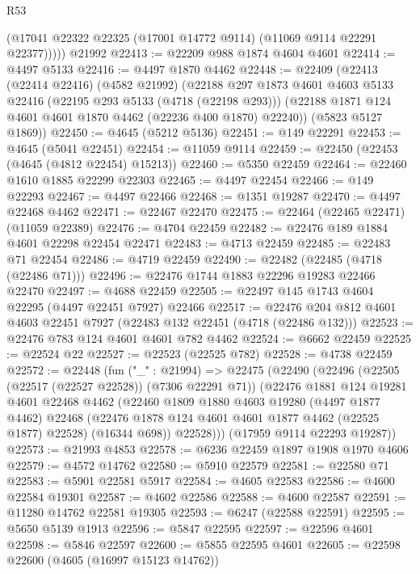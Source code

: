 \begin{lexlean}{R53}
\begin{coremodule}
          (@17041 @22322 @22325 (@17001 @14772 @9114) (@11069 @9114 @22291 @22377)))))
    @21992
@22413 := @22209 @988 @1874 @4604 @4601
@22414 := @4497 @5133
@22416 := @4497 @1870 @4462
@22448 := @22409
    (@22413
      (@22414 @22416)
      (@4582 @21992)
      (@22188
        @297
        @1873
        @4601
        @4603
        @5133
        @22416
        (@22195 @293 @5133 (@4718 (@22198 @293)))
        (@22188 @1871 @124 @4601 @4601 @1870 @4462 (@22236 @400 @1870) @22240))
      (@5823 @5127 @1869))
@22450 := @4645 (@5212 @5136)
@22451 := @149 @22291
@22453 := @4645 (@5041 @22451)
@22454 := @11059 @9114
@22459 := @22450 (@22453 (@4645 (@4812 @22454) @15213))
@22460 := @5350 @22459
@22464 := @22460 @1610 @1885 @22299 @22303
@22465 := @4497 @22454
@22466 := @149 @22293
@22467 := @4497 @22466
@22468 := @1351 @19287
@22470 := @4497 @22468 @4462
@22471 := @22467 @22470
@22475 := @22464 (@22465 @22471) (@11059 @22389)
@22476 := @4704 @22459
@22482 := @22476 @189 @1884 @4601 @22298 @22454 @22471
@22483 := @4713 @22459
@22485 := @22483 @71 @22454
@22486 := @4719 @22459
@22490 := @22482 (@22485 (@4718 (@22486 @71)))
@22496 := @22476 @1744 @1883 @22296 @19283 @22466 @22470
@22497 := @4688 @22459
@22505 := @22497 @145 @1743 @4604 @22295 (@4497 @22451 @7927) @22466
@22517 := @22476 @204 @812 @4601 @4603 @22451 @7927 (@22483 @132 @22451 (@4718 (@22486 @132)))
@22523 := @22476 @783 @124 @4601 @4601 @782 @4462
@22524 := @6662 @22459
@22525 := @22524 @22
@22527 := @22523 (@22525 @782)
@22528 := @4738 @22459
@22572 := @22448
    (fun ("_" : @21994) =>
    @22475
      (@22490
        (@22496
          (@22505 (@22517 (@22527 @22528)) (@7306 @22291 @71))
          (@22476
            @1881
            @124
            @19281
            @4601
            @22468
            @4462
            (@22460
              @1809
              @1880
              @4603
              @19280
              (@4497 @1877 @4462)
              @22468
              (@22476 @1878 @124 @4601 @4601 @1877 @4462 (@22525 @1877) @22528)
              (@16344 @698))
            @22528)))
      (@17959 @9114 @22293 @19287))
@22573 := @21993 @4853
@22578 := @6236 @22459 @1897 @1908 @1970 @4606
@22579 := @4572 @14762
@22580 := @5910 @22579
@22581 := @22580 @71
@22583 := @5901 @22581 @5917
@22584 := @4605 @22583
@22586 := @4600 @22584 @19301
@22587 := @4602 @22586
@22588 := @4600 @22587
@22591 := @11280 @14762 @22581 @19305
@22593 := @6247 (@22588 @22591)
@22595 := @5650 @5139 @1913
@22596 := @5847 @22595
@22597 := @22596 @4601
@22598 := @5846 @22597
@22600 := @5855 @22595 @4601
@22605 := @22598 @22600 (@4605 (@16997 @15123 @14762))

\end{coremodule}
\end{lexlean}
